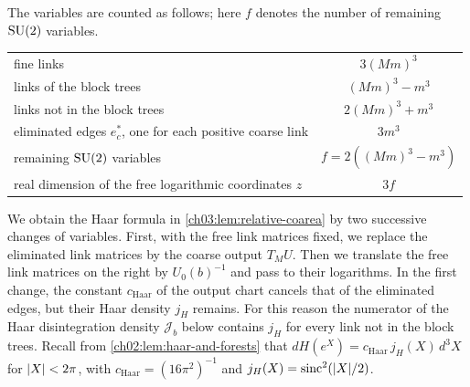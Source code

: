 The variables are counted as follows; here $f$ denotes the number of remaining $\mathrm{SU}(2)$ variables.
\begin{center}
\begin{tabular}{lc}
\toprule
fine links & $3(Mm)^3$\\
links of the block trees & $(Mm)^3-m^3$\\
links not in the block trees & $2(Mm)^3+m^3$\\
eliminated edges $e^*_c$, one for each positive coarse link & $3m^3$\\
remaining $\mathrm{SU}(2)$ variables & $f=2((Mm)^3-m^3)$\\
real dimension of the free logarithmic coordinates $z$ & $3f$\\
\bottomrule
\end{tabular}
\end{center}
We obtain the Haar formula in \cref{ch03:lem:relative-coarea} by two successive changes of variables. First, with the free link matrices fixed, we replace the eliminated link matrices by the coarse output $T_MU$. Then we translate the free link matrices on the right by $U_0(b)^{-1}$ and pass to their logarithms. In the first change, the constant $c_{\mathrm{Haar}}$ of the output chart cancels that of the eliminated edges, but their Haar density $j_H$ remains. For this reason the numerator of the Haar disintegration density $\mathscr J_b$ below contains $j_H$ for every link not in the block trees. Recall from \cref{ch02:lem:haar-and-forests} that $dH(e^X)=c_{\mathrm{Haar}}\,j_H(X)\,d^3X$ for $\lvert X\rvert<2\pi$, with $c_{\mathrm{Haar}}=(16\pi^2)^{-1}$ and $j_H(X)=\operatorname{sinc}^2(\lvert X\rvert/2)$.


